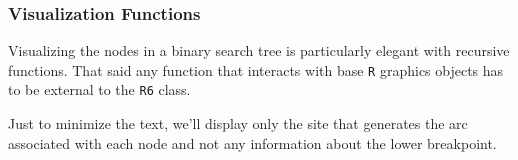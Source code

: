\documentclass[
  letterpaper,
  DIV=11,
  numbers=noendperiod]{scrartcl}
\newenvironment{Shaded}{\begin{snugshade}}{\end{snugshade}}
\newcommand{\AttributeTok}[1]{\textcolor[rgb]{0.40,0.45,0.13}{#1}}
\newcommand{\ConstantTok}[1]{\textcolor[rgb]{0.56,0.35,0.01}{#1}}
\newcommand{\ControlFlowTok}[1]{\textcolor[rgb]{0.00,0.23,0.31}{#1}}
\newcommand{\DecValTok}[1]{\textcolor[rgb]{0.68,0.00,0.00}{#1}}
\newcommand{\FunctionTok}[1]{\textcolor[rgb]{0.28,0.35,0.67}{#1}}
\newcommand{\NormalTok}[1]{\textcolor[rgb]{0.00,0.23,0.31}{#1}}
\newcommand{\OtherTok}[1]{\textcolor[rgb]{0.00,0.23,0.31}{#1}}
\newcommand{\SpecialCharTok}[1]{\textcolor[rgb]{0.37,0.37,0.37}{#1}}
\newcommand{\StringTok}[1]{\textcolor[rgb]{0.13,0.47,0.30}{#1}}
\begin{document}
\subsubsection{Visualization Functions}\label{visualization-functions}

Visualizing the nodes in a binary search tree is particularly elegant
with recursive functions. That said any function that interacts with
base \texttt{R} graphics objects has to be external to the \texttt{R6}
class.

\begin{Shaded}
\end{Shaded}

Just to minimize the text, we'll display only the site that generates
the arc associated with each node and not any information about the
lower breakpoint.
\end{document}
